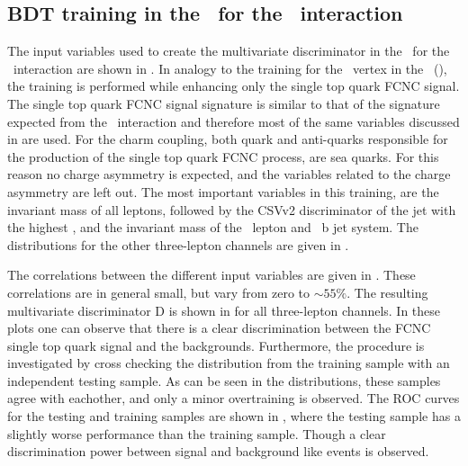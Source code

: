 \clearpage	
\subsection{BDT training in the \STSR\ for the \Zct\ interaction}
\label{sec:BDTSTSRZCT}
The input variables used to create the multivariate discriminator in the \STSR\ for the \Zct\ interaction are shown in . In analogy to the training for the \Zut\ vertex in the \STSR\ (), the training is performed while enhancing only the single top quark FCNC signal. The single top quark FCNC  signal signature is similar to that of the signature expected from the \Zut\ interaction and therefore most of the same variables discussed in  are used. For the charm coupling, both quark and anti-quarks responsible for the production of the single top quark FCNC process, are sea quarks. For this reason no charge asymmetry is expected, and the variables related to the charge asymmetry are left out.
 The most important variables in this training,  are the invariant mass of all leptons,  followed by the CSVv2 discriminator of the jet with the highest \pt, and the invariant mass of the \PW\ lepton and \SM\ b jet system. The distributions for the other three-lepton channels are given in .
 
 
The correlations between the different input variables are given in . These correlations are in general small, but vary from zero to $\sim55\%$.
The resulting multivariate discriminator D is shown in  for all three-lepton channels. In these plots one can observe that there is a clear discrimination between the FCNC single top quark signal and the backgrounds. Furthermore, the procedure is investigated by cross checking the distribution from the training sample with an independent testing sample. As can be seen in the distributions, these samples agree with eachother, and only a minor overtraining is observed. The ROC curves for the testing and training samples are shown in , where the testing sample has a slightly worse performance than the training sample. Though a clear discrimination power between signal and background like events is observed. 

